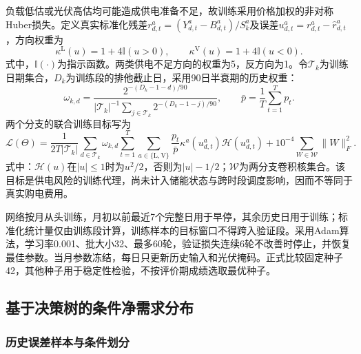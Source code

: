 负载低估或光伏高估均可能造成供电准备不足，故训练采用价格加权的非对称Huber损失。定义真实标准化残差$r^a_{d,t}=(Y^a_{d,t}-B^a_{d,t})/S_k^a$及误差$u^a_{d,t}=r^a_{d,t}-\widehat r^a_{d,t}$，方向权重为
\begin{equation}\label{eq:q2-asymmetry}
 \kappa^{\mathrm L}(u)=1+4\mathbb I(u>0),\qquad
 \kappa^{\mathrm V}(u)=1+4\mathbb I(u<0).
\end{equation}
式中，$\mathbb I(\cdot)$为指示函数。两类供电不足方向的权重为5，反方向为1。令$\mathcal T_k$为训练日期集合，$D_k$为训练段的排他截止日，采用90日半衰期的历史权重：
\begin{equation}\label{eq:q2-time-weight}
 \omega_{k,d}=\frac{2^{-(D_k-1-d)/90}}
 {|\mathcal T_k|^{-1}\sum_{j\in\mathcal T_k}2^{-(D_k-1-j)/90}},
 \qquad \bar p=\frac1T\sum_{t=1}^{T}p_t.
\end{equation}
两个分支的联合训练目标写为
\begin{equation}\label{eq:q2-train-objective}
 \mathcal L(\Theta)=
 \frac{1}{2T|\mathcal T_k|}\sum_{d\in\mathcal T_k}\omega_{k,d}
 \sum_{t=1}^{T}\sum_{a\in\{\mathrm L,\mathrm V\}}
 \frac{p_t}{\bar p}\kappa^a(u^a_{d,t})\mathcal H(u^a_{d,t})
 +10^{-4}\sum_{W\in\mathcal W}\|W\|_F^2.
\end{equation}
式中：$\mathcal H(u)$在$|u|\le1$时为$u^2/2$，否则为$|u|-1/2$；$\mathcal W$为两分支卷积核集合。该目标是供电风险的训练代理，尚未计入储能状态与跨时段调度影响，因而不等同于真实购电费用。

网络按月从头训练，月初以前最近7个完整日用于早停，其余历史日用于训练；标准化统计量仅由训练段计算，训练样本的目标窗口不得跨入验证段。采用Adam算法，学习率0.001、批大小32、最多60轮，验证损失连续6轮不改善时停止，并恢复最佳参数。当月参数冻结，每日只更新历史输入和光伏掩码。正式比较固定种子42，其他种子用于稳定性检验，不按评价期成绩选取最优种子。

\subsection{基于决策树的条件净需求分布}
\subsubsection{历史误差样本与条件划分}

